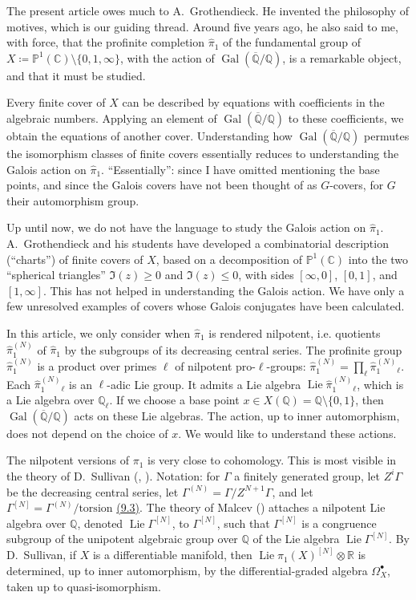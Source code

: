 \documentclass{article}
\theoremstyle{definition}
\newcommand{\bb}{\mathbb}
\newcommand{\PP}{\bb{P}}
\newcommand{\RR}{\bb{R}}
\newcommand{\CC}{\bb{C}}
\newcommand{\QQ}{\bb{Q}}
\newcommand{\cQQ}{\overline{\QQ}}
\renewcommand{\geq}{\geqslant}
\renewcommand{\leq}{\leqslant}
\DeclareMathOperator{\Gal}{Gal}
\DeclareMathOperator{\Lie}{Lie}
\newcommand{\oldpage}[1]{\marginpar{\footnotesize$\Big\vert$ \textit{p.~#1}}}
\begin{document}
The present article owes much to A.~Grothendieck.
He invented the philosophy of motives, which is our guiding thread.
Around five years ago, he also said to me, with force, that the profinite completion $\hat{\pi}_1$ of the fundamental group of $X\coloneqq\PP^1(\CC)\setminus\{0,1,\infty\}$, with the action of $\Gal(\cQQ/\QQ)$, is a remarkable object, and that it must be studied.

Every finite cover of $X$ can be described by equations with coefficients in the algebraic numbers.
Applying an element of $\Gal(\cQQ/\QQ)$ to these coefficients, we obtain the equations of another cover.
Understanding how $\Gal(\cQQ/\QQ)$ permutes the isomorphism classes of finite covers essentially reduces to understanding the Galois action on $\hat{\pi}_1$.
``Essentially'': since I have omitted mentioning the base points, and since the Galois covers have not been thought of as $G$-covers, for $G$ their automorphism group.

Up until now, we do not have the language to study the Galois action on $\hat{\pi}_1$.
A.~Grothendieck and his students have developed a combinatorial description (``charts'') of finite covers of $X$, based on a decomposition of $\PP^1(\CC)$ into the two ``spherical triangles'' $\Im(z)\geq0$ and $\Im(z)\leq0$, with sides $[\infty,0]$, $[0,1]$, and $[1,\infty]$.
This has not helped in understanding the Galois action.
We have only a few unresolved examples of covers whose Galois conjugates have been calculated.

In this article, we only consider when $\hat{\pi}_1$ is rendered nilpotent, i.e. quotients $\hat{\pi}_1^{(N)}$ of $\hat{\pi}_1$ by the subgroups of its decreasing central series.
The profinite group $\hat{\pi}_1^{(N)}$ is a product over primes $\ell$ of nilpotent pro-$\ell$-groups: $\hat{\pi}_1^{(N)} = \prod_\ell \hat{\pi}_1^{(N)}{}\!_\ell$.
Each $\hat{\pi}_1^{(N)}{}\!_\ell$ is an $\ell$-adic Lie group.
It admits a Lie algebra $\Lie\hat{\pi}_1^{(N)}{}\!_\ell$, which is a Lie algebra over $\QQ_\ell$.
If we choose a base point $x\in X(\QQ)=\QQ\setminus\{0,1\}$, then $\Gal(\cQQ/\QQ)$ acts on these Lie algebras.
The action, up to inner automorphism, does not depend on the choice of $x$.
We would like to understand these actions.

The nilpotent versions of $\pi_1$ is very close to cohomology.
This is most visible in the theory of D.~Sullivan (\cite{Su}, \cite{Mo}).
Notation: for $\Gamma$ a finitely generated group, let $Z^i\Gamma$ be the decreasing central series, let $\Gamma^{(N)}=\Gamma/Z^{N+1}\Gamma$, and let $\Gamma^{[N]}=\Gamma^{(N)}/\mathrm{torsion}$ \hyperref[9.3]{(9.3)}.
The theory of Malcev (\cite{Mal}) attaches a nilpotent Lie algebra over $\QQ$, denoted $\Lie\Gamma^{[N]}$, to $\Gamma^{[N]}$, such that $\Gamma^{[N]}$ is a congruence subgroup of the unipotent algebraic group over $\QQ$ of the Lie algebra $\Lie\Gamma^{[N]}$.
By D.~Sullivan, if $X$ is a differentiable manifold, then $\Lie\pi_1(X)^{[N]}\otimes\RR$ is determined, up to inner automorphism, by the differential-graded algebra $\Omega_X^\bullet$, taken
\oldpage{82}
up to quasi-isomorphism.
\end{document}
